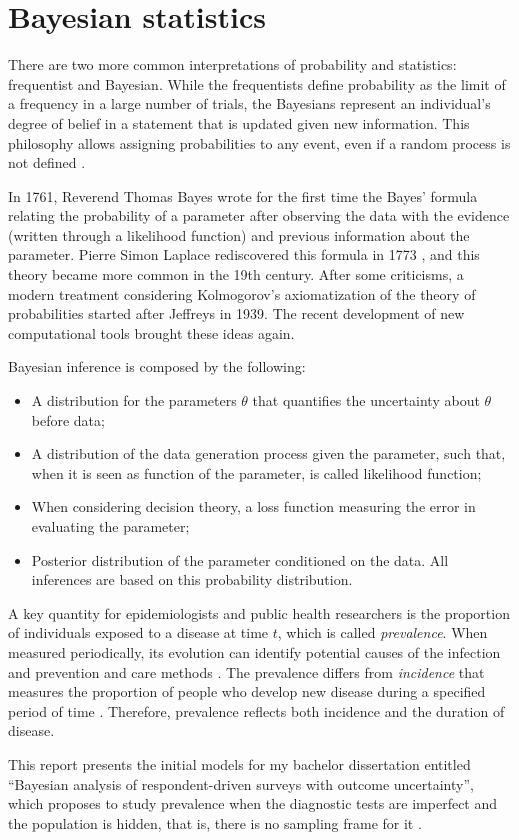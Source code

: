 \chapter{Bayesian statistics}

There are two more common interpretations of probability and statistics:
frequentist and Bayesian. While the frequentists define
probability as the limit of a frequency in a large number of trials, the
Bayesians represent an individual's degree of belief in a statement that is
updated given new information. This philosophy allows assigning probabilities
to any event, even if a random process is not defined \cite{statisticat2016laplacesdemon}. 

In 1761, Reverend Thomas Bayes wrote for the first time the Bayes' formula
relating the probability of a parameter after observing the data with the
evidence (written through a likelihood function) and previous information
about the parameter. Pierre Simon Laplace rediscovered this formula in 1773
\cite{Robert2007}, and this theory became more common in the 19th century.
After some criticisms, a modern treatment considering Kolmogorov's axiomatization of the theory of probabilities started after Jeffreys in 1939.
The recent development of new computational tools brought these ideas again.

Bayesian inference is composed by the following: 

\begin{itemize}
    \item A distribution for the parameters $\theta$ that quantifies the
    uncertainty about $\theta$ before data;
    \item A distribution of the data generation process given the parameter,
    such that, when it is seen as function of the parameter, is called
    likelihood function;
    \item When considering decision theory, a loss function measuring the
    error in evaluating the parameter;
    \item Posterior distribution of the parameter conditioned on the data. All
    inferences are based on this probability distribution.
\end{itemize} 

A key quantity for epidemiologists and public health researchers is the
proportion of individuals exposed to a disease at time $t$, which is called
{\em prevalence}. When measured
periodically, its evolution can identify potential causes of the infection
and prevention and care methods \cite[]{noordzij2010measures}. The prevalence
differs from {\em incidence } that measures the proportion of people who
develop new disease during a specified period of time
\cite[]{rothman2008modern}. Therefore, prevalence reflects both incidence and the
duration of disease. 

This report presents the initial models for my bachelor dissertation entitled ``Bayesian analysis of respondent-driven surveys with
outcome uncertainty'', which proposes to study prevalence when the diagnostic
tests are imperfect and the population is hidden, that is, there is no
sampling frame for it \cite[]{heckathorn1997}. 
